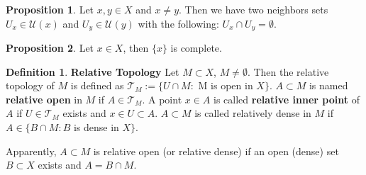 \documentclass{article}
\theoremstyle{definition}
\newtheorem{defi}{Definition}[subsection]
\newtheorem{prop}{Proposition}[subsection]
\begin{document}
\begin{prop}
Let $x,y\in X$ and $x\neq y$. Then we have two neighbors sets $U_x\in \mathcal{U}(x)$ and $U_y\in\mathcal{U}(y)$ with the following: $U_x\cap U_y = \emptyset$.
\end{prop}
\begin{prop}
Let $x\in X$, then $\{x\}$ is complete.
\end{prop}
\begin{defi}
\textbf{Relative Topology} Let $M\subset X$, $M \neq \emptyset$. Then the relative topology of $M$ is defined as $\mathcal{T}_M := \{U\cap M:$ M is open in $X\}$. $A \subset M$ is named \textbf{relative open} in $M$ if $A \in \mathcal{T}_M$. A point $x\in A$ is called \textbf{relative inner point} of $A$ if $U\in\mathcal{T}_M$ exists and $x\in U\subset A$. $A\subset M$ is called relatively dense in $M$ if $A\in\{B\cap M: B$ is dense in $X\}$.

Apparently, $A\subset M$ is relative open (or relative dense) if an open (dense) set $B\subset X$ exists and $A=B\cap M$.
\end{defi}
\end{document}
